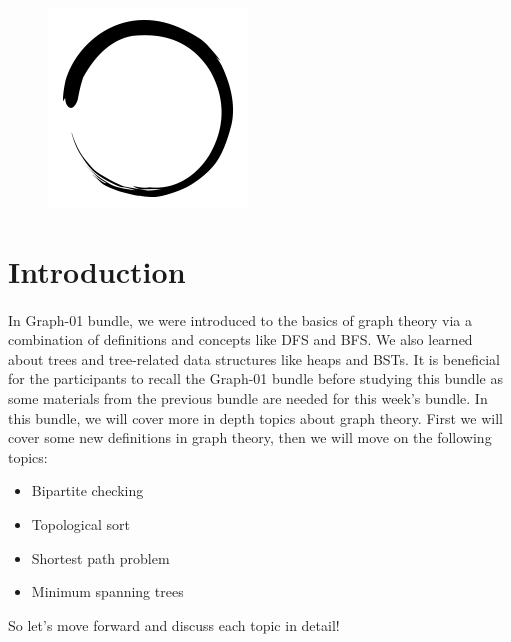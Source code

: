 \documentclass[12pt]{article}
\title{\vspace{-2em}\mytitle\vspace{-0.3em}}
\author{\textbf{Editor}\\Uğur Uysal\\ \ \\ \textbf{Reviewer} \\M.Besher Massri}
\date{}
\begin{document}
\begin{figure}
  \centering
  \includegraphics[width=\linewidth/4]{inzva-logo.png}
  \label{fig:inzva}
\end{figure}
\maketitle

\cleardoublepage
\tableofcontents
{}
\cleardoublepage
\newcommand{\sectionbreak}{\clearpage}

\section{Introduction}
\paragraph{}
In Graph-01 bundle, we were introduced to the basics of graph theory via a combination of definitions and concepts like DFS and BFS. We also learned about trees and tree-related data structures like heaps and BSTs. It is beneficial for the participants to recall the Graph-01 bundle before studying this bundle as some materials from the previous bundle are needed for this week's bundle.
\newline\newline
In this bundle, we will cover more in depth topics about graph theory. First we will cover some new definitions in graph theory, then we will move on the following topics:
\begin{itemize}
    \item Bipartite checking
    \item Topological sort
    \item Shortest path problem
    \item Minimum spanning trees
    
\end{itemize}
So let's move forward and discuss each topic in detail!
\end{document}
